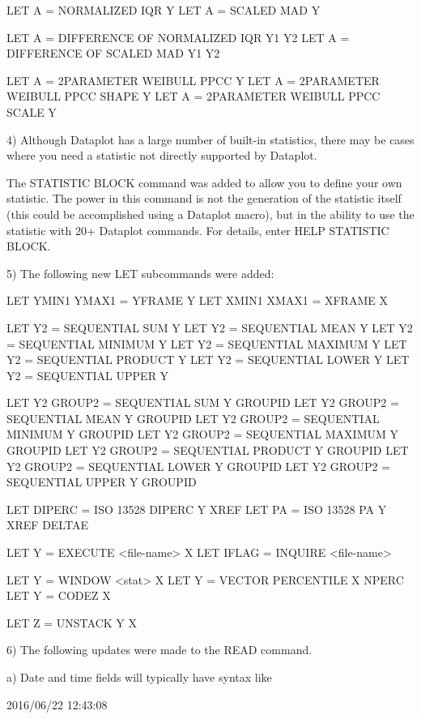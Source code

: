        LET A = NORMALIZED IQR Y
       LET A = SCALED MAD Y

       LET A = DIFFERENCE OF NORMALIZED IQR Y1 Y2
       LET A = DIFFERENCE OF SCALED MAD Y1 Y2

       LET A = 2PARAMETER WEIBULL PPCC Y
       LET A = 2PARAMETER WEIBULL PPCC SHAPE Y
       LET A = 2PARAMETER WEIBULL PPCC SCALE Y

 4) Although Dataplot has a large number of built-in statistics,
    there may be cases where you need a statistic not directly
    supported by Dataplot.

    The STATISTIC BLOCK command was added to allow you to define
    your own statistic.  The power in this command is not the
    generation of the statistic itself (this could be accomplished
    using a Dataplot macro), but in the ability to use the
    statistic with 20+ Dataplot commands.  For details, enter
    HELP STATISTIC BLOCK.

 5) The following new LET subcommands were added:

       LET YMIN1 YMAX1 = YFRAME Y
       LET XMIN1 XMAX1 = XFRAME X

       LET Y2 = SEQUENTIAL SUM Y
       LET Y2 = SEQUENTIAL MEAN Y
       LET Y2 = SEQUENTIAL MINIMUM Y
       LET Y2 = SEQUENTIAL MAXIMUM Y
       LET Y2 = SEQUENTIAL PRODUCT Y
       LET Y2 = SEQUENTIAL LOWER Y
       LET Y2 = SEQUENTIAL UPPER Y

       LET Y2 GROUP2 = SEQUENTIAL SUM Y GROUPID
       LET Y2 GROUP2 = SEQUENTIAL MEAN Y GROUPID
       LET Y2 GROUP2 = SEQUENTIAL MINIMUM Y GROUPID
       LET Y2 GROUP2 = SEQUENTIAL MAXIMUM Y GROUPID
       LET Y2 GROUP2 = SEQUENTIAL PRODUCT Y GROUPID
       LET Y2 GROUP2 = SEQUENTIAL LOWER Y GROUPID
       LET Y2 GROUP2 = SEQUENTIAL UPPER Y GROUPID

       LET DIPERC = ISO 13528 DIPERC Y XREF
       LET PA     = ISO 13528 PA     Y XREF DELTAE

       LET Y = EXECUTE <file-name> X
       LET IFLAG = INQUIRE <file-name>

       LET Y = WINDOW <stat> X
       LET Y = VECTOR PERCENTILE X NPERC
       LET Y = CODEZ X

       LET Z = UNSTACK Y X

 6) The following updates were made to the READ command.

    a) Date and time fields will typically have syntax like

         2016/06/22
         12:43:08

